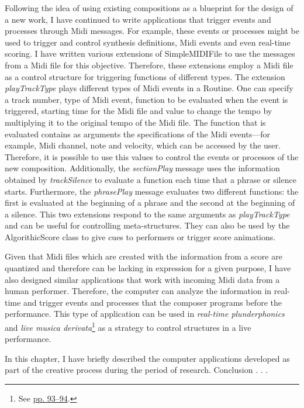 Following the idea of using existing compositions as a blueprint for the design of a new work, I have continued to write applications that trigger events and processes through Midi messages. For example, these events or processes might be used to trigger and control synthesis definitions, Midi events and even real-time scoring. I have written various extensions of SimpleMIDIFile to use the messages from a Midi file for this objective. Therefore, these extensions employ a Midi file as a control structure for triggering functions of different types.
The extension \emph{playTrackType} plays different types of Midi events in a Routine. One can specify a track number, type of Midi event, function to be evaluated when the event is triggered, starting time for the Midi file and  value to change the tempo by multiplying it to the original tempo of the Midi file. The function that is evaluated contains as arguments the specifications of the Midi events---for example, Midi channel, note and velocity, which can be accessed by the user. Therefore, it is possible to use this values to control the events or processes of the new composition. Additionally, the \emph{sectionPlay} message uses the information obtained by \emph{trackSilence} to evaluate a function each time that a phrase or silence starts. Furthermore, the \emph{phrasePlay} message evaluates two different functions: the first is evaluated at the beginning of a phrase and the second at the beginning of a silence. This two extensions respond to the same arguments as \emph{playTrackType} and can be useful for controlling meta-structures. They can also be used by the AlgorithicScore class to give cues to performers or trigger score animations. 

Given that Midi files which are created with the information from a score are quantized and therefore can be lacking in expression for a given purpose, I have also designed similar applications that work with incoming Midi data from a human performer. Therefore, the computer can analyze the information in real-time and trigger events and processes that the composer programs before the performance. This type of application can be used in \emph{real-time plunderphonics} and \emph{live musica derivata}\footnote{See \hyperlink{realtimeplunderfuck}{pp. 93--94}.} as a strategy to control structures in a live performance.




In this chapter, I have briefly described the computer applications developed as part of the creative process during the period of research. Conclusion . . .

\label{ch:compapp}